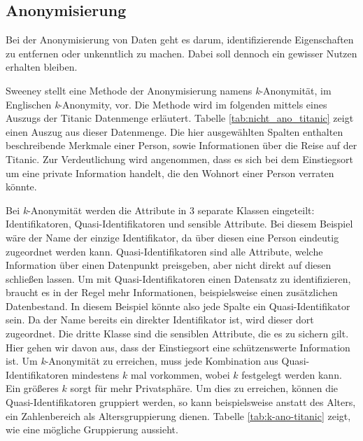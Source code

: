 \subsection{Anonymisierung}\label{sec:anonymisierung}

Bei der Anonymisierung von Daten geht es darum, identifizierende Eigenschaften zu entfernen oder unkenntlich zu machen.
Dabei soll dennoch ein gewisser Nutzen erhalten bleiben. 

Sweeney \cite{P-23} stellt eine Methode der Anonymisierung namens \textit{k}-Anonymität, im Englischen \textit{k}-Anonymity, vor.
Die Methode wird im folgenden mittels eines Auszugs der Titanic Datenmenge \cite{D-titanic} erläutert.
Tabelle \ref{tab:nicht_ano_titanic} zeigt einen Auszug aus dieser Datenmenge.
Die hier ausgewählten Spalten enthalten beschreibende Merkmale einer Person, sowie Informationen über die Reise auf der Titanic. 
Zur Verdeutlichung wird angenommen, dass es sich bei dem Einstiegsort um eine private Information handelt, die den Wohnort einer Person verraten könnte.



Bei \textit{k}-Anonymität werden die Attribute in 3 separate Klassen eingeteilt: Identifikatoren, Quasi-Identifikatoren und sensible Attribute.
Bei diesem Beispiel wäre der Name der einzige Identifikator, da über diesen eine Person eindeutig zugeordnet werden kann. 
Quasi-Identifikatoren sind alle Attribute, welche Information über einen Datenpunkt preisgeben, aber nicht direkt auf diesen schließen lassen. 
Um mit Quasi-Identifikatoren einen Datensatz zu identifizieren, braucht es in der Regel mehr Informationen, beispielsweise einen zusätzlichen Datenbestand.
In diesem Beispiel könnte also jede Spalte ein Quasi-Identifikator sein.
Da der Name bereits ein direkter Identifikator ist, wird dieser dort zugeordnet.
Die dritte Klasse sind die sensiblen Attribute, die es zu sichern gilt. 
Hier gehen wir davon aus, dass der Einstiegsort eine schützenswerte Information ist.
Um \textit{k}-Anonymität zu erreichen, muss jede Kombination aus Quasi-Identifikatoren mindestens $k$ mal vorkommen, wobei $k$ festgelegt werden kann. 
Ein größeres $k$ sorgt für mehr Privatsphäre.
Um dies zu erreichen, können die Quasi-Identifikatoren gruppiert werden, so kann beispielsweise anstatt des Alters, ein Zahlenbereich als Altersgruppierung dienen.
Tabelle \ref{tab:k-ano-titanic} zeigt, wie eine mögliche Gruppierung aussieht.



